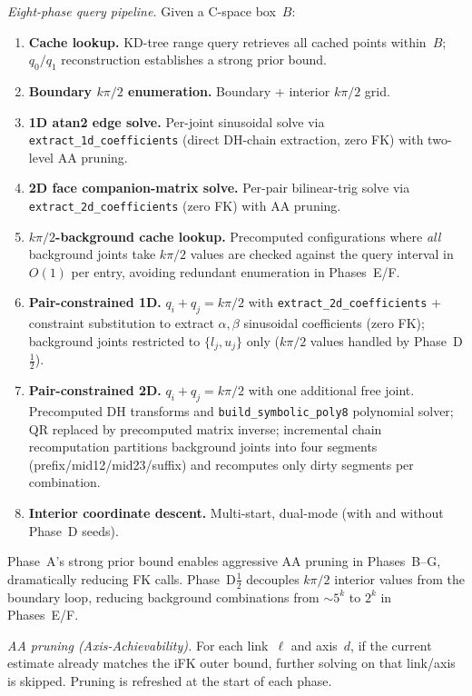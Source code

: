 \documentclass[journal]{IEEEtran}
\begin{document}
\emph{Eight-phase query pipeline.}
Given a C-space box~$B$:
\begin{enumerate}
  \item[\textbf{A.}] \textbf{Cache lookup.}
    KD-tree range query retrieves all cached points within~$B$;
    $q_0/q_1$ reconstruction establishes a strong prior bound.
  \item[\textbf{B.}] \textbf{Boundary $k\pi/2$ enumeration.}
    Boundary + interior $k\pi/2$ grid.
  \item[\textbf{C.}] \textbf{1D atan2 edge solve.}
    Per-joint sinusoidal solve via \texttt{extract\_1d\_coefficients}
    (direct DH-chain extraction, zero FK) with two-level AA pruning.
  \item[\textbf{D.}] \textbf{2D face companion-matrix solve.}
    Per-pair bilinear-trig solve via \texttt{extract\_2d\_coefficients}
    (zero FK) with AA pruning.
  \item[\textbf{D$\tfrac{1}{2}$.}] \textbf{$k\pi/2$-background cache lookup.}
    Precomputed configurations where \emph{all} background joints
    take $k\pi/2$ values are checked against the query interval
    in $O(1)$ per entry, avoiding redundant enumeration in
    Phases~E/F.
  \item[\textbf{E.}] \textbf{Pair-constrained 1D.}
    $q_i + q_j = k\pi/2$ with \texttt{extract\_2d\_coefficients}
    + constraint substitution to extract $\alpha,\beta$ sinusoidal
    coefficients (zero FK); background joints restricted to
    $\{l_j, u_j\}$ only ($k\pi/2$ values handled by Phase~D$\tfrac{1}{2}$).
  \item[\textbf{F.}] \textbf{Pair-constrained 2D.}
    $q_i + q_j = k\pi/2$ with one additional free joint.
    Precomputed DH transforms and \texttt{build\_symbolic\_poly8}
    polynomial solver; QR replaced by precomputed matrix inverse;
    incremental chain recomputation partitions background joints
    into four segments (prefix/mid12/mid23/suffix) and recomputes
    only dirty segments per combination.
  \item[\textbf{G.}] \textbf{Interior coordinate descent.}
    Multi-start, dual-mode (with and without Phase~D seeds).
\end{enumerate}
Phase~A's strong prior bound enables aggressive AA pruning in
Phases~B--G, dramatically reducing FK calls.
Phase~D$\tfrac{1}{2}$ decouples $k\pi/2$ interior values from the
boundary loop, reducing background combinations from
$\sim\!5^k$ to $2^k$ in Phases~E/F.

\emph{AA pruning (Axis-Achievability).}
For each link~$\ell$ and axis~$d$, if the current estimate
already matches the iFK outer bound, further solving on that
link/axis is skipped.
Pruning is refreshed at the start of each phase.
\end{document}
